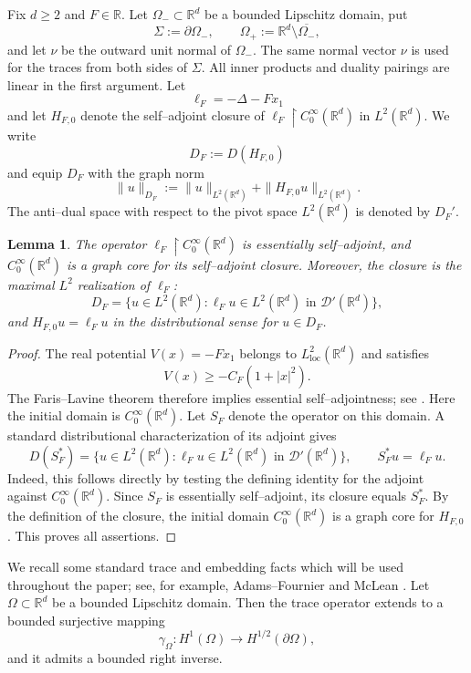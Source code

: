 \documentclass[a4paper,11pt]{article}
\numberwithin{equation}{section}
\newtheorem{lem}{Lemma}[section]
\theoremstyle{remark}
\theoremstyle{definition}
\theoremstyle{remark}
\begin{document}
Fix $d\ge2$ and $F\in\mathbb R$.
Let $\Omega_-\subset\mathbb R^d$ be a bounded Lipschitz domain, put
$$
\Sigma:=\partial\Omega_-,
\qquad
\Omega_+:=\mathbb R^d\setminus\overline{\Omega_-},
$$
and let $\nu$ be the outward unit normal of $\Omega_-$.
The same normal vector $\nu$ is used for the traces from both sides of $\Sigma$.
All inner products and duality pairings are linear in the first argument.
Let
$$
\ell_F=-\Delta-Fx_1
$$
and let $H_{F,0}$ denote the self--adjoint closure of $\ell_F\upharpoonright C_0^\infty(\mathbb R^d)$ in $L^2(\mathbb R^d)$.
We write
$$
D_F:=D(H_{F,0})
$$
and equip $D_F$ with the graph norm
$$
\|u\|_{D_F}:=\|u\|_{L^2(\mathbb R^d)}
+\|H_{F,0}u\|_{L^2(\mathbb R^d)}.
$$
The anti--dual space with respect to the pivot space $L^2(\mathbb R^d)$ is denoted by $D_F'$.

\begin{lem}\label{lem:free-maximal}
The operator $\ell_F\upharpoonright C_0^\infty(\mathbb R^d)$ is essentially self--adjoint, and $C_0^\infty(\mathbb R^d)$ is a graph core for its self--adjoint closure.
Moreover, the closure is the maximal $L^2$ realization of $\ell_F$:
$$
D_F
=
\bigl\{u\in L^2(\mathbb R^d):
\ell_Fu\in L^2(\mathbb R^d)
\text{ in }\mathcal D'(\mathbb R^d)\bigr\},
$$
and $H_{F,0}u=\ell_Fu$ in the distributional sense for $u\in D_F$.
\end{lem}

\begin{proof}
The real potential $V(x)=-Fx_1$ belongs to $L^2_{\mathrm{loc}}(\mathbb R^d)$ and satisfies
$$
V(x)\ge -C_F(1+|x|^2).
$$
The Faris--Lavine theorem therefore implies essential self--adjointness; see \cite[Theorem~X.28]{ReedSimonII}.
Here the initial domain is $C_0^\infty(\mathbb R^d)$.
Let $S_F$ denote the operator on this domain.
A standard distributional characterization of its adjoint gives
$$
D(S_F^*)
=
\bigl\{u\in L^2(\mathbb R^d):
\ell_Fu\in L^2(\mathbb R^d)
\text{ in }\mathcal D'(\mathbb R^d)\bigr\},
\qquad
S_F^*u=\ell_Fu.
$$
Indeed, this follows directly by testing the defining identity for the adjoint against $C_0^\infty(\mathbb R^d)$.
Since $S_F$ is essentially self--adjoint, its closure equals $S_F^*$.
By the definition of the closure, the initial domain $C_0^\infty(\mathbb R^d)$ is a graph core for $H_{F,0}$.
This proves all assertions.
\end{proof}

We recall some standard trace and embedding facts which will be used throughout the paper; see, for example, Adams--Fournier \cite{AdamsFournier2003} and McLean \cite{McLean2000}.
Let $\Omega\subset\mathbb R^d$ be a bounded Lipschitz domain.
Then the trace operator extends to a bounded surjective mapping
$$
\gamma_\Omega:H^1(\Omega)\to H^{1/2}(\partial\Omega),
$$
and it admits a bounded right inverse.
\end{document}
